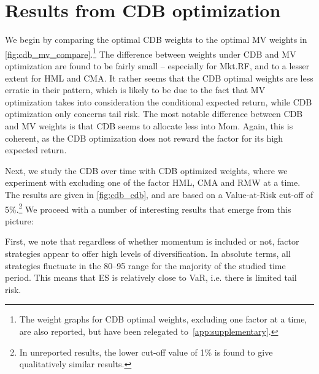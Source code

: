 
\section{Results from CDB optimization} %
\label{sec:cdb_optimization}


We begin by comparing the optimal CDB weights to the optimal MV weights in \autoref{fig:cdb_mv_compare}.\footnote{The weight graphs for CDB optimal weights, excluding one factor at a time, are also reported, but have been relegated to~\autoref{app:supplementary}.} The difference between weights under CDB and MV optimization are found to be fairly small -- especially for Mkt.RF, and to a lesser extent for HML and CMA.  It rather seems that the CDB optimal weights are less erratic in their pattern, which is likely to be due to the fact that MV optimization takes into consideration the conditional expected return, while CDB optimization only concerns tail risk. The most notable difference between CDB and MV weights is that CDB seems to allocate less into Mom. Again, this is coherent, as the CDB optimization does not reward the factor for its high expected return. 

Next, we study the CDB over time with CDB optimized weights, where we experiment with excluding one of the factor HML, CMA and RMW at a time. The results are given in \autoref{fig:cdb_cdb}, and are based on a Value-at-Risk cut-off of 5\%.\footnote{In unreported results, the lower cut-off value of 1\% is found to give qualitatively similar results.} We proceed with a number of interesting results that emerge from this picture:

First, we note that regardless of whether momentum is included or not, factor strategies appear to offer high levels of diversification. In absolute terms, all strategies fluctuate in the 80--95 range for the majority of the studied time period. This means that ES is relatively close to VaR, i.e. there is limited tail risk.

